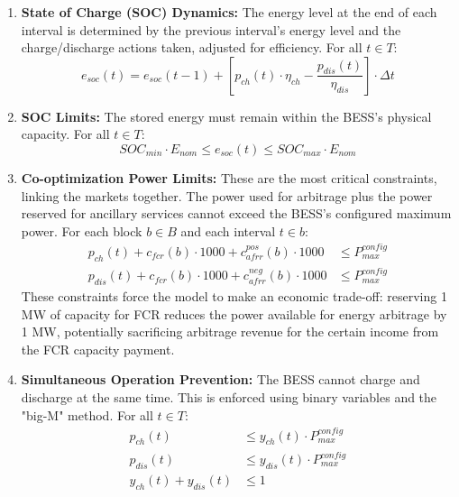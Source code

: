 \begin{enumerate}
    \item \textbf{State of Charge (SOC) Dynamics:} The energy level at the end of each interval is determined by the previous interval's energy level and the charge/discharge actions taken, adjusted for efficiency. For all $t \in T$:
    \begin{equation}
    e_{soc}(t) = e_{soc}(t-1) + \left[ p_{ch}(t) \cdot \eta_{ch} - \frac{p_{dis}(t)}{\eta_{dis}} \right] \cdot \Delta t
    \end{equation}

    \item \textbf{SOC Limits:} The stored energy must remain within the BESS's physical capacity. For all $t \in T$:
    \begin{equation}
    SOC_{min} \cdot E_{nom} \leq e_{soc}(t) \leq SOC_{max} \cdot E_{nom}
    \end{equation}

    \item \textbf{Co-optimization Power Limits:} These are the most critical constraints, linking the markets together. The power used for arbitrage plus the power reserved for ancillary services cannot exceed the BESS's configured maximum power. For each block $b \in B$ and each interval $t \in b$:
    \begin{align}
    p_{ch}(t) + c_{fcr}(b) \cdot 1000 + c_{afrr}^{pos}(b) \cdot 1000 &\leq P_{max}^{config} \\
    p_{dis}(t) + c_{fcr}(b) \cdot 1000 + c_{afrr}^{neg}(b) \cdot 1000 &\leq P_{max}^{config}
    \end{align}
    These constraints force the model to make an economic trade-off: reserving 1 MW of capacity for FCR reduces the power available for energy arbitrage by 1 MW, potentially sacrificing arbitrage revenue for the certain income from the FCR capacity payment.

    \item \textbf{Simultaneous Operation Prevention:} The BESS cannot charge and discharge at the same time. This is enforced using binary variables and the "big-M" method. For all $t \in T$:
    \begin{align}
    p_{ch}(t) &\leq y_{ch}(t) \cdot P_{max}^{config} \\
    p_{dis}(t) &\leq y_{dis}(t) \cdot P_{max}^{config} \\
    y_{ch}(t) + y_{dis}(t) &\leq 1
    \end{align}


\end{enumerate}
